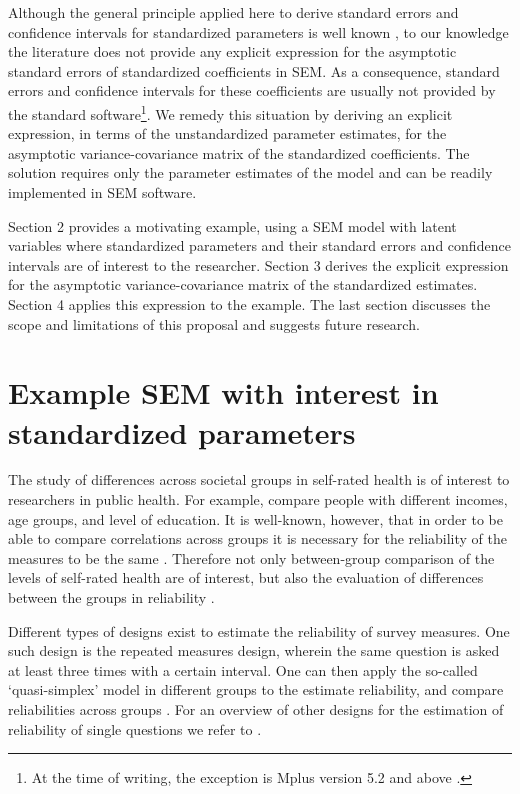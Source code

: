 \documentclass[a4paper,11pt]{article}
\newcommand{\0}{\boldsymbol{0}}
\begin{document}
Although the general principle applied here to derive standard errors and confidence intervals for standardized parameters is well known  \citep[e.g.][]{oehlert1992note}, to our knowledge the literature does not provide any explicit expression for the asymptotic standard errors of standardized coefficients in SEM. As a consequence, standard errors and confidence intervals for these coefficients are usually not provided by the standard software\footnote{At the time of writing, the exception is Mplus version 5.2 and above \citep{muthen1998mplus}.}.  We remedy this situation by deriving an explicit expression, in terms of the unstandardized parameter estimates, for the asymptotic variance-covariance matrix of the standardized coefficients. The solution requires only the parameter estimates of the model and can be readily implemented in SEM software.

Section 2 provides a motivating example, using a SEM model with latent
variables where standardized parameters and their standard errors and confidence
intervals are of interest to the researcher.
Section 3 derives the explicit expression for the asymptotic variance-covariance matrix of the standardized estimates. Section 4 applies this expression to the example. The last section discusses the scope and limitations of this proposal and suggests future research.


\section{Example SEM with interest in standardized parameters}


The study of differences across societal groups in self-rated health is of interest to researchers in public health.   For example,  \cite{von2006education} 
compare people with different incomes, age groups, and level of education.
It is well-known, however, that in order to be able to compare correlations across groups it is necessary for the reliability of 
the measures to be the same \citep[e.g.][]{steenkamp1998assessing,saris_design_2007}. Therefore not only between-group comparison of the levels of self-rated health are of interest, 
but also the evaluation of differences between the groups in reliability \citep{lundberg1996assessing}. 

Different types of designs exist to estimate the reliability of survey measures. One such design is the repeated measures design, wherein the
same question is asked at least three times with a certain interval. One can then apply the so-called `quasi-simplex' model in different groups to the estimate
reliability, and compare reliabilities across groups \citep{heise1970validity,wiley35wiley}. For an overview of other designs for the estimation of reliability of single questions we refer to \cite{alwin_margins_2007}. 
\end{document}
